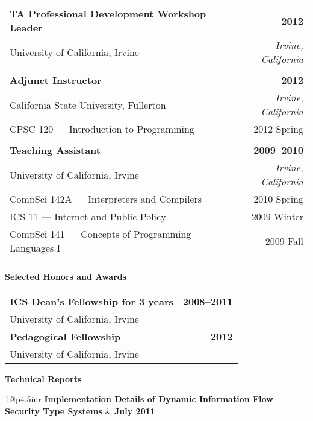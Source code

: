 {\begin{tabular*}{1\textwidth}{@{\extracolsep{\fill}}lr}
  \textbf{TA Professional Development Workshop Leader} & \textbf{2012} \\
  University of California, Irvine & \emph{Irvine, California} \\
  \\

  \textbf{Adjunct Instructor} & \textbf{2012} \\
  California State University, Fullerton & \emph{Irvine, California} \\
  CPSC 120 --- Introduction to Programming & 2012 Spring \\
  \\

  \textbf{Teaching Assistant} & \textbf{2009--2010} \\
  University of California, Irvine & \emph{Irvine, California} \\
  CompSci 142A --- Interpreters and Compilers & 2010 Spring \\
  ICS 11 ---  Internet and Public Policy & 2009 Winter \\
  CompSci 141 --- Concepts of Programming Languages I & 2009 Fall \\

\pagebreak

\end{tabular*}

\vspace{12pt}
\textbf{Selected Honors and Awards}

\begin{tabular*}{1\textwidth}{@{\extracolsep{\fill}}lr}
  \textbf{ICS Dean's Fellowship for 3 years} & \textbf{2008--2011} \\
  \vspace{6pt}
  University of California, Irvine & \\
  \textbf{Pedagogical Fellowship} & \textbf{2012} \\
  \vspace{6pt}
  University of California, Irvine & \\
\end{tabular*}


\vspace{12pt}
\textbf{Technical Reports}

\begin{tabular*}{1\textwidth}{@{\extracolsep{\fill}}p{4.5in}r}
  \textbf{Implementation Details of Dynamic Information Flow Security Type Systems} & \textbf{July 2011} \\
   \\
\end{tabular*}

}
